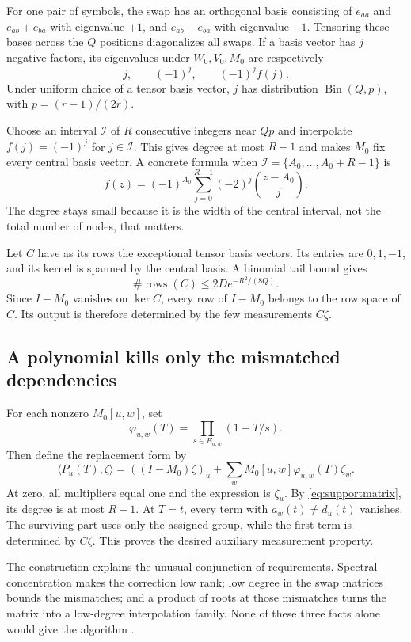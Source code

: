 \documentclass[11pt,a4paper]{article}
\numberwithin{equation}{section}
\theoremstyle{definition}
\theoremstyle{remark}
\begin{document}
For one pair of symbols, the swap has an orthogonal basis consisting of
$e_{aa}$ and $e_{ab}+e_{ba}$ with eigenvalue $+1$, and $e_{ab}-e_{ba}$ with
eigenvalue $-1$. Tensoring these bases across the $Q$ positions diagonalizes
all swaps. If a basis vector has $j$ negative factors, its eigenvalues under
$W_0,V_0,M_0$ are respectively
\[
 j,\qquad(-1)^j,\qquad(-1)^jf(j).
\]
Under uniform choice of a tensor basis vector, $j$ has distribution
$\operatorname{Bin}(Q,p)$, with $p=(r-1)/(2r)$.

Choose an interval $\mathcal I$ of $R$ consecutive integers near $Qp$ and
interpolate $f(j)=(-1)^j$ for $j\in\mathcal I$. This gives degree at most
$R-1$ and makes $M_0$ fix every central basis vector. A concrete formula when
$\mathcal I=\{A_0,\ldots,A_0+R-1\}$ is
\[
 f(z)=(-1)^{A_0}\sum_{j=0}^{R-1}(-2)^j\binom{z-A_0}{j}.
\]
The degree stays small because it is the width of the central interval, not
the total number of nodes, that matters.

Let $C$ have as its rows the exceptional tensor basis vectors. Its entries
are $0,1,-1$, and its kernel is spanned by the central basis. A binomial tail
bound gives
\begin{equation}\label{eq:exceptional}
 \#\operatorname{rows}(C)
 \le2D e^{-R^2/(8Q)}.
\end{equation}
Since $I-M_0$ vanishes on $\ker C$, every row of $I-M_0$ belongs to the row
space of $C$. Its output is therefore determined by the few measurements
$C\zeta$.

\subsection{A polynomial kills only the mismatched dependencies}
For each nonzero $M_0[u,w]$, set
\[
 \varphi_{u,w}(T)=\prod_{s\in E_{u,w}}(1-T/s).
\]
Then define the replacement form by
\begin{equation}\label{eq:auxrow}
 \langle P_u(T),\zeta\rangle
 =((I-M_0)\zeta)_u+
   \sum_wM_0[u,w]\varphi_{u,w}(T)\zeta_w.
\end{equation}
At zero, all multipliers equal one and the expression is $\zeta_u$.
By \eqref{eq:supportmatrix}, its degree is at most $R-1$.
At $T=t$, every term with $a_w(t)\ne d_u(t)$ vanishes. The surviving part
uses only the assigned group, while the first term is determined by $C\zeta$.
This proves the desired auxiliary measurement property.

The construction explains the unusual conjunction of requirements. Spectral
concentration makes the correction low rank; low degree in the swap matrices
bounds the mismatches; and a product of roots at those mismatches turns the
matrix into a low-degree interpolation family. None of these three facts
alone would give the algorithm \cite{paper}.
\end{document}

